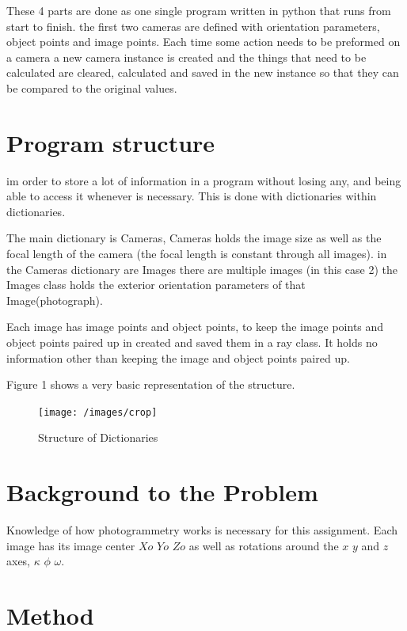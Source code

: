 \documentclass[11pt,a4paper]{article}
\begin{document}
	These 4 parts are done as one single program written in python that runs from start to finish. the first two cameras are defined with orientation parameters, object points and image points. Each time some action needs to be preformed on a camera a new camera instance is created and the things that need to be calculated are cleared, calculated and saved in the new instance so that they can be compared to the original values.
	
	\section{Program structure}
	
	im order to store a lot of information in a program without losing any, and being able to access it whenever is necessary. This is done with dictionaries within dictionaries.
	
	The main dictionary is Cameras, Cameras holds the image size as well as the focal length of the camera (the focal length is constant through all images). in the Cameras dictionary are Images there are multiple images (in this case 2) the Images class holds the exterior orientation parameters of that Image(photograph).
	
	Each image has image points and object points, to keep the image points and object points paired up in created and saved them in a ray class. It holds no information other than keeping the image and object points paired up.
	
	Figure 1 shows a very basic representation of the structure.
	
	\begin{figure}[H]
		\centering
		\texttt{[image: /images/crop]}
		\caption{Structure of Dictionaries}
		\label{fig:structure}
	\end{figure}


	\section{Background to the Problem}
	
	Knowledge of how photogrammetry works is necessary for this assignment. Each image has its image center $Xo$ $Yo$ $Zo$ as well as rotations around the $x$ $y$ and $z$ axes, $\kappa$ $\phi$ $\omega$. 
	
	\section{Method}
	
\end{document}
